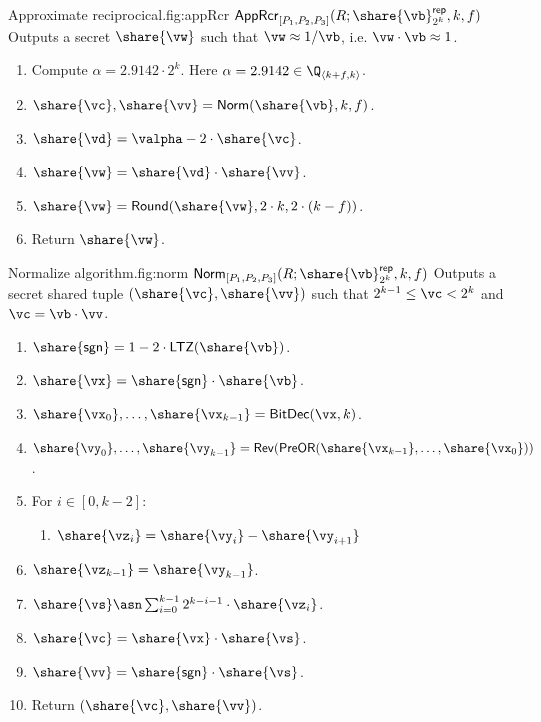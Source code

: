 \begin{Boxfig}{Approximate reciprocical.}{fig:appRcr}
  {$\mathsf{AppRcr}_{[P_1, P_2, P_3]}(R; \share{\vb}^\mathsf{rep}_{2^k}, k, f)$}
  Outputs a secret $\share{\vw}$ such that $\vw \approx 1/\vb$, i.e. $\vw \cdot \vb \approx 1$.
  \begin{enumerate}
    \item Compute $\alpha = 2.9142 \cdot 2^k$. Here $\alpha = 2.9142 \in \Q_{\langle k + f, k\rangle}$.
    \item $\share{\vc}, \share{\vv} = \mathsf{Norm}(\share{\vb}, k, f)$.
    \item $\share{\vd} = \valpha - 2 \cdot \share{\vc}$.
    \item $\share{\vw} = \share{\vd} \cdot \share{\vv}$.
    \item $\share{\vw} = \mathsf{Round}(\share{\vw}, 2 \cdot k, 2 \cdot (k - f))$.
  \item Return $\share{\vw}$.
\end{enumerate}
\end{Boxfig}


\begin{Boxfig}{Normalize algorithm.}{fig:norm}
  {$\mathsf{Norm}_{[P_1, P_2, P_3]}(R; \share{\vb}^\mathsf{rep}_{2^k}, k, f)$}
  Outputs a secret shared tuple $(\share{\vc}, \share{\vv})$ such that $2^{k-1} \leq \vc < 2^k$ and $\vc = \vb \cdot \vv$.
  \begin{enumerate}
    \item $\share{\mathsf{sgn}} = 1 - 2 \cdot \mathsf{LTZ}(\share{\vb})$.
    \item $\share{\vx} = \share{\mathsf{sgn}} \cdot \share{\vb}$.
    \item $\share{\vx_0}, \dots, \share{\vx_{k-1}} = \mathsf{BitDec}(\vx, k)$.
    \item $\share{\vy_0}, \dots, \share{\vy_{k-1}} = \mathsf{Rev}(\mathsf{PreOR}(\share{\vx_{k-1}}, \dots, \share{\vx_0}))$.
    \item For $i \in [0, k-2]$:
    \begin{enumerate}
        \item $\share{\vz_i} = \share{\vy_i} - \share{\vy_{i+1}}$
    \end{enumerate}
    \item $\share{\vz_{k-1}} = \share{\vy_{k-1}}$.
    \item $\share{\vs} \asn \sum_{i=0}^{k-1}2^{k-i-1} \cdot \share{\vz_i}$.
    \item $\share{\vc} = \share{\vx} \cdot \share{\vs}$.
    \item $\share{\vv} = \share{\mathsf{sgn}} \cdot \share{\vs}$.
    \item Return $(\share{\vc}, \share{\vv})$.
\end{enumerate}
\end{Boxfig}



